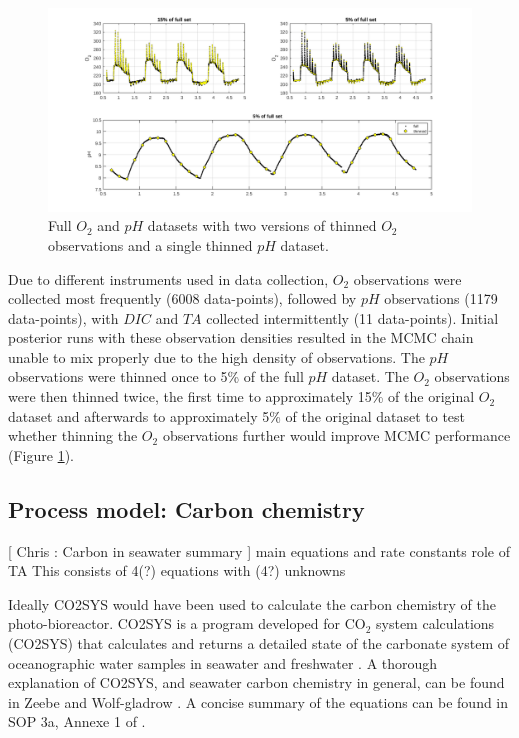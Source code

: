 \documentclass{ruthesis}
\begin{document}
\begin{figure}
	\centerline{\includegraphics[width=1.25\textwidth]{images_microalgae/plots/thinned_obs_micro}}
	\caption[.]{Full $O_2$ and $pH$ datasets with two versions of thinned $O_2$ observations and a single thinned $pH$ dataset.}
	\label{fig:thinned_obs_micro}
\end{figure}
Due to different instruments used in data collection, $O_2$ observations were collected most frequently (6008 data-points), followed by $pH$ observations (1179 data-points), with $DIC$ and $TA$ collected intermittently (11 data-points). Initial posterior runs with these observation densities resulted in the MCMC chain unable to mix properly due to the high density of observations. The $pH$ observations were thinned once to 5\% of the full $pH$ dataset. The $O_2$ observations were then thinned twice, the first time to approximately 15\% of the original $O_2$ dataset and afterwards to approximately 5\% of the original dataset to test whether thinning the $O_2$ observations further would improve MCMC performance (Figure \ref{fig:thinned_obs_micro}).

\FloatBarrier
\subsection{Process model: Carbon chemistry}

[ Chris : Carbon in seawater summary ]
main equations and rate constants
role of TA
This consists of 4(?) equations with (4?) unknowns

Ideally CO2SYS \cite{lewis1998program} would have been used to calculate the carbon chemistry of the photo-bioreactor. 
CO2SYS is a program developed for CO$_2$ system calculations (CO2SYS) that calculates and returns a detailed state of the carbonate system of oceanographic water samples in seawater and freshwater \cite{lewis1998program}.
A thorough explanation of CO2SYS, and seawater carbon chemistry in general, can be found in  Zeebe and Wolf-gladrow \cite{zeebe2001co2}.  A concise summary of the equations can be found in SOP 3a, Annexe 1 of \cite{dickson2007guide}.
\end{document}
